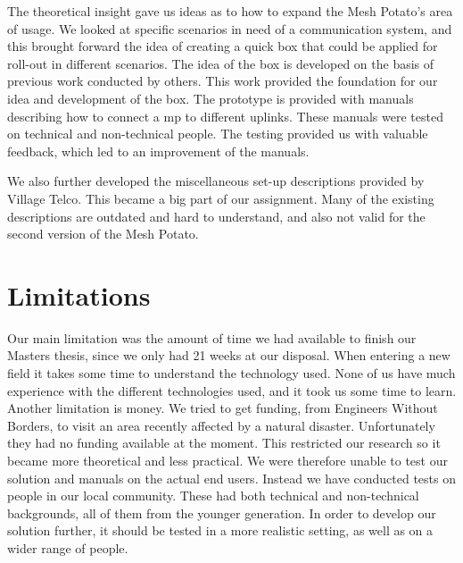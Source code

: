 The theoretical insight gave us ideas as to how to expand the Mesh Potato's area of usage. We looked at specific scenarios in need of a communication system, and this brought forward the idea of creating a \gls{quick} box that could be applied for roll-out in different scenarios. The idea of the box is developed on the basis of previous work conducted by others. This work provided the foundation for our idea and development of the box. The prototype is provided with manuals describing how to connect a \gls{mp} to different uplinks. These manuals were tested on technical and non-technical people. The testing provided us with valuable feedback, which led to an improvement of the manuals. 

We also further developed the miscellaneous set-up descriptions provided by Village Telco. This became a big part of our assignment. Many of the existing descriptions are outdated and hard to understand, and also not valid for the second version of the Mesh Potato.



\section{Limitations}
Our main limitation was the amount of time we had available to finish our Masters thesis, since we only had 21 weeks at our disposal. When entering a new field it takes some time to understand the technology used. None of us have much experience with the different technologies used, and it took us some time to learn. Another limitation is money. We tried to get funding, from Engineers Without Borders, to visit an area recently affected by a natural disaster. Unfortunately they had no funding available at the moment. This restricted our research so it became more theoretical and less practical. We were therefore unable to test our solution and manuals on the actual end users. Instead we have conducted tests on people in our local community. These had both technical and non-technical backgrounds, all of them from the younger generation. In order to develop our solution further, it should be tested in a more realistic setting, as well as on a wider range of people. 


